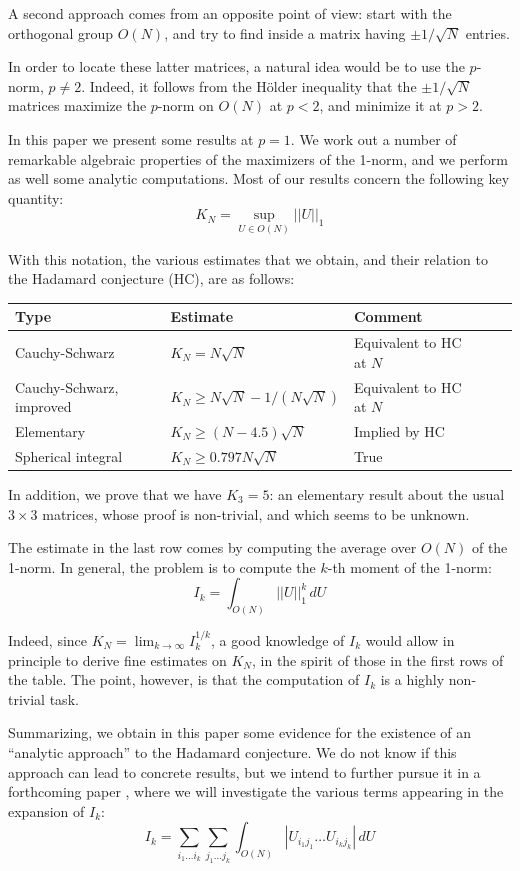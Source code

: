 \documentclass[12pt]{amsart}
\begin{document}
A second approach comes from an opposite point of view: start with the orthogonal  group $O(N)$, and try to find inside a matrix having $\pm 1/\sqrt{N}$ entries. 

In order to locate these latter matrices, a natural idea would be to use the $p$-norm, $p\neq 2$. Indeed, it follows from the H\"older inequality that the $\pm 1/\sqrt{N}$ matrices maximize the $p$-norm on $O(N)$ at $p<2$, and minimize it at $p>2$.

In this paper we present some results at $p=1$. We work out a number of remarkable algebraic properties of the maximizers of the 1-norm, and we perform as well some analytic computations. Most of our results concern the following key quantity:
$$K_N=\sup_{U\in O(N)}||U||_1$$

With this notation, the various estimates that we obtain, and their relation to the Hadamard conjecture (HC), are as follows:
\begin{center}
\begin{tabular}[t]{|l|l|l|l|l|}
\hline Type&Estimate&Comment\\
\hline
\hline Cauchy-Schwarz&$K_N=N\sqrt{N}$&Equivalent to HC at $N$\\
\hline Cauchy-Schwarz, improved&$K_N\geq N\sqrt{N}-1/(N\sqrt{N})$&Equivalent to HC at $N$\\
\hline Elementary&$K_N\geq (N-4.5)\sqrt{N}$&Implied by HC\\
\hline Spherical integral&$K_N\geq 0.797N\sqrt{N}$&True\\
\hline
\end{tabular}
\end{center}
\medskip

In addition, we prove that we have $K_3=5$: an elementary  result about the usual $3\times 3$ matrices, whose proof is non-trivial, and which seems to be unknown.

The estimate in the last row comes by computing the average over $O(N)$ of the 1-norm. In general, the problem is to compute the $k$-th moment of the 1-norm:
$$I_k=\int_{O(N)}||U||_1^k\,dU$$

Indeed, since $K_N=\lim_{k\to\infty}I_k^{1/k}$, a good knowledge of $I_k$ would allow in principle to derive fine estimates on $K_N$, in the spirit of those in the first rows of the table. The point, however, is that the computation of $I_k$ is a highly non-trivial task.

Summarizing, we obtain in this paper some evidence for the existence of an ``analytic approach'' to the Hadamard conjecture. We do not know if this approach can lead to concrete results, but we intend to further pursue it in a forthcoming paper \cite{bcs}, where we will investigate the various terms appearing in the expansion of $I_k$:
$$I_k=\sum_{i_1\ldots i_k}\sum_{j_1\ldots j_k}\int_{O(N)}|U_{i_1j_1}\ldots U_{i_kj_k}|\,dU$$
\end{document}
